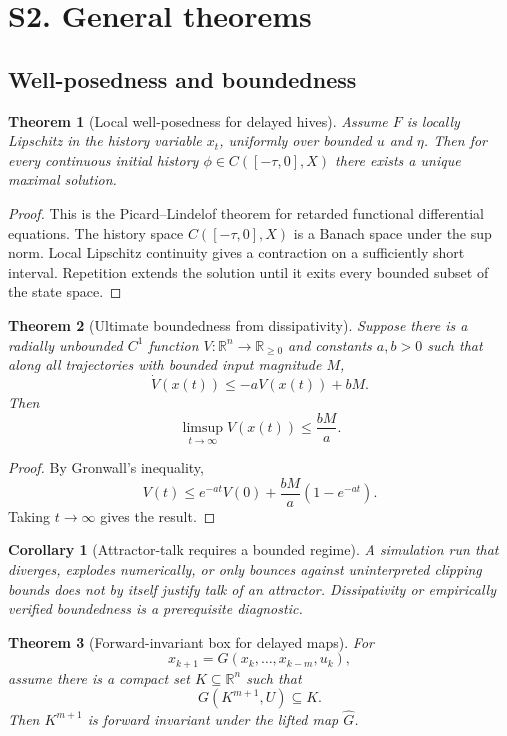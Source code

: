 \documentclass[11pt]{article}
\newtheorem{theorem}{Theorem}
\newtheorem{corollary}{Corollary}
\begin{document}
\section{S2. General theorems}

\subsection{Well-posedness and boundedness}

\begin{theorem}[Local well-posedness for delayed hives]
Assume $F$ is locally Lipschitz in the history variable $x_t$, uniformly over
bounded $u$ and $\eta$.  Then for every continuous initial history
$\phi\in C([ -\tau,0],X)$ there exists a unique maximal solution.
\end{theorem}

\begin{proof}
This is the Picard--Lindelof theorem for retarded functional differential
equations.  The history space $C([ -\tau,0],X)$ is a Banach space under the sup
norm.  Local Lipschitz continuity gives a contraction on a sufficiently short
interval.  Repetition extends the solution until it exits every bounded subset of
the state space.
\end{proof}

\begin{theorem}[Ultimate boundedness from dissipativity]
Suppose there is a radially unbounded $C^1$ function
$V:\mathbb R^n\to\mathbb R_{\ge0}$ and constants $a,b>0$ such that along all
trajectories with bounded input magnitude $M$,
\[
  \dot V(x(t))\le -aV(x(t))+bM.
\]
Then
\[
  \limsup_{t\to\infty}V(x(t))\le \frac{bM}{a}.
\]
\end{theorem}

\begin{proof}
By Gronwall's inequality,
\[
  V(t)\le e^{-at}V(0)+\frac{bM}{a}(1-e^{-at}).
\]
Taking $t\to\infty$ gives the result.
\end{proof}

\begin{corollary}[Attractor-talk requires a bounded regime]
A simulation run that diverges, explodes numerically, or only bounces against
uninterpreted clipping bounds does not by itself justify talk of an attractor.
Dissipativity or empirically verified boundedness is a prerequisite diagnostic.
\end{corollary}

\begin{theorem}[Forward-invariant box for delayed maps]
For
\[
  x_{k+1}=G(x_k,\ldots,x_{k-m},u_k),
\]
assume there is a compact set $K\subseteq\mathbb R^n$ such that
\[
  G(K^{m+1},U)\subseteq K.
\]
Then $K^{m+1}$ is forward invariant under the lifted map $\widehat G$.
\end{theorem}
\end{document}
